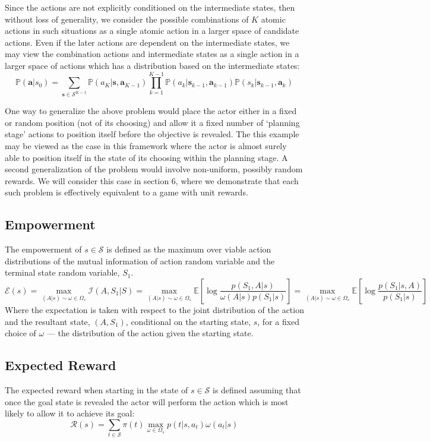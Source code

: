\documentclass{article}
\newcommand{\EE}{\mathbb{E}}
\newcommand{\PP}{\mathbb{P}}
\newcommand{\Ss}{\mathcal{S}}
\newcommand{\Ii}{\mathcal{I}}
\newcommand{\Ee}{\mathcal{E}}
\newcommand{\Rr}{\mathcal{R}}
\begin{document}
Since the actions are not explicitly conditioned on the intermediate states, then without loss of generality, we consider the possible combinations of $K$ atomic actions in such situations as a single atomic action in a larger space of candidate actions.
Even if the later actions are dependent on the intermediate states, we may view the combination actions and intermediate states as a single action in a larger space of actions which has a distribution based on the intermediate states:
\[\PP(\mathbf{a}|s_0) = \sum_{\mathbf{s}\in \Ss^{K-1}} \PP(a_K|\mathbf{s},\mathbf{a}_{K-1}) \prod_{k=1}^{K-1} \PP(a_k|\mathbf{s}_{k-1},\mathbf{a}_{k-1})\PP(s_{k}|\mathbf{s}_{k-1},\mathbf{a}_k)\]

One way to generalize the above problem would place the actor either in a fixed or random position (not of its choosing) and allow it a fixed number of `planning stage' actions to position itself before the objective is revealed. 
The this example may be viewed as the case in this framework where the actor is almost surely able to position itself in the state of its choosing within the planning stage.
A second generalization of the problem would involve non-uniform, possibly random rewards. We will consider this case in section 6, where we demonstrate that each such problem is effectively equivalent to a game with unit rewards. 


\subsection{Empowerment}
The empowerment of $s\in\mathcal{S}$ is defined as the maximum over viable action distributions of the mutual information of action random variable and the terminal state random variable, $S_1$.
\[\Ee(s)=\max_{(A|s)\sim\omega\in\Omega_s}\Ii(A,S_1|S)=\max_{(A|s)\sim\omega\in\Omega_s}\EE\left[\log\frac{p(S_1,A|s)}{\omega(A|s)p(S_1|s)}\right]=\max_{(A|s)\sim\omega\in\Omega_s}\EE\left[\log\frac{p(S_1|s,A)}{p(S_1|s)}\right] \]
Where the expectation is taken with respect to the joint distribution of the action and the resultant state, $(A,S_1)$, conditional on the starting state, $s$, for a fixed choice of $\omega$ --- the distribution of the action given the starting state. 
\subsection{Expected Reward}
The expected reward when starting in the state of $s\in\mathcal{S}$ is defined assuming that once the goal state is revealed the actor will perform the action which is most likely to allow it to achieve its goal:
\[\Rr(s) = \sum_{t\in\Ss} \pi(t) \max_{\omega\in\Omega_s} p(t|s,a_t)\omega(a_t|s)\]
\end{document}

